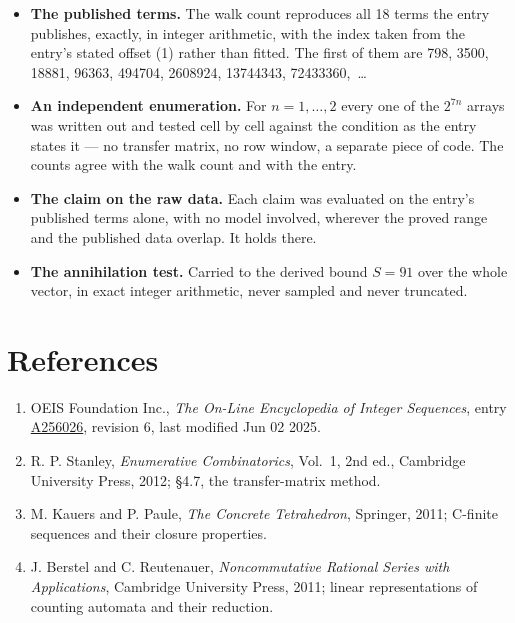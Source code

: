 \documentclass[11pt]{article}
\theoremstyle{definition}
\begin{document}
\begin{itemize}

\item {\bfseries The published terms.} The walk count reproduces all 18 terms the entry publishes, exactly, in integer arithmetic, with the index taken from the entry's stated offset (1) rather than fitted. The first of them are 798, 3500, 18881, 96363, 494704, 2608924, 13744343, 72433360,~\dots

\item {\bfseries An independent enumeration.} For $n = 1,\dots,2$ every one of the $2^{7n}$ arrays was written out and tested cell by cell against the condition as the entry states it --- no transfer matrix, no row window, a separate piece of code. The counts agree with the walk count and with the entry.

\item {\bfseries The claim on the raw data.} Each claim was evaluated on the entry's published terms alone, with no model involved, wherever the proved range and the published data overlap. It holds there.

\item {\bfseries The annihilation test.} Carried to the derived bound $S = 91$ over the whole vector, in exact integer arithmetic, never sampled and never truncated.

\end{itemize}

\section{References}

\begin{enumerate}

\item OEIS Foundation Inc., \emph{The On-Line Encyclopedia of Integer Sequences}, entry \href{https://oeis.org/A256026}{A256026}, revision 6, last modified Jun 02 2025.

\item R. P. Stanley, \emph{Enumerative Combinatorics}, Vol.~1, 2nd ed., Cambridge University Press, 2012; \S4.7, the transfer-matrix method.

\item M. Kauers and P. Paule, \emph{The Concrete Tetrahedron}, Springer, 2011; C-finite sequences and their closure properties.

\item J. Berstel and C. Reutenauer, \emph{Noncommutative Rational Series with Applications}, Cambridge University Press, 2011; linear representations of counting automata and their reduction.

\end{enumerate}
\end{document}
